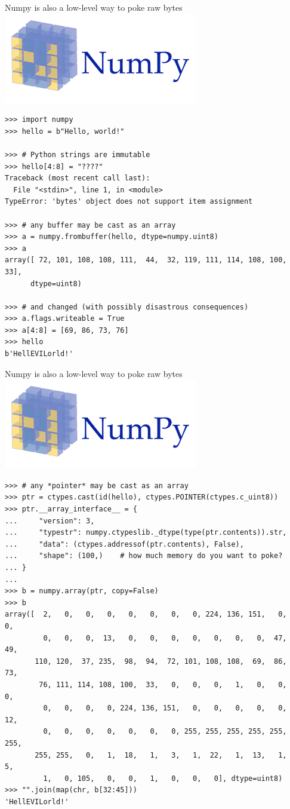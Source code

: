 \documentclass[aspectratio=169]{beamer}
\begin{document}
\begin{frame}[fragile]{Numpy is also a low-level way to poke raw bytes}
\vspace{0.5 cm}
\hfill \includegraphics[height=1.5 cm]{numpy-logo.png}

\scriptsize
\vspace{-1.5 cm}
\begin{verbatim}
>>> import numpy
>>> hello = b"Hello, world!"

>>> # Python strings are immutable
>>> hello[4:8] = "????"
Traceback (most recent call last):
  File "<stdin>", line 1, in <module>
TypeError: 'bytes' object does not support item assignment

>>> # any buffer may be cast as an array
>>> a = numpy.frombuffer(hello, dtype=numpy.uint8)
>>> a
array([ 72, 101, 108, 108, 111,  44,  32, 119, 111, 114, 108, 100,  33],
      dtype=uint8)

>>> # and changed (with possibly disastrous consequences)
>>> a.flags.writeable = True
>>> a[4:8] = [69, 86, 73, 76]
>>> hello
b'HellEVILorld!'
\end{verbatim}
\end{frame}

\begin{frame}[fragile]{Numpy is also a low-level way to poke raw bytes}
\vspace{0.5 cm}
\hfill \includegraphics[height=1.5 cm]{numpy-logo.png}

\scriptsize
\vspace{-1.5 cm}
\begin{verbatim}
>>> # any *pointer* may be cast as an array
>>> ptr = ctypes.cast(id(hello), ctypes.POINTER(ctypes.c_uint8))
>>> ptr.__array_interface__ = {
...     "version": 3,
...     "typestr": numpy.ctypeslib._dtype(type(ptr.contents)).str,
...     "data": (ctypes.addressof(ptr.contents), False),
...     "shape": (100,)    # how much memory do you want to poke?
... }
... 
>>> b = numpy.array(ptr, copy=False)
>>> b
array([  2,   0,   0,   0,   0,   0,   0,   0, 224, 136, 151,   0,   0,
         0,   0,   0,  13,   0,   0,   0,   0,   0,   0,   0,  47,  49,
       110, 120,  37, 235,  98,  94,  72, 101, 108, 108,  69,  86,  73,
        76, 111, 114, 108, 100,  33,   0,   0,   0,   1,   0,   0,   0,
         0,   0,   0,   0, 224, 136, 151,   0,   0,   0,   0,   0,  12,
         0,   0,   0,   0,   0,   0,   0, 255, 255, 255, 255, 255, 255,
       255, 255,   0,   1,  18,   1,   3,   1,  22,   1,  13,   1,   5,
         1,   0, 105,   0,   0,   1,   0,   0,   0], dtype=uint8)
>>> "".join(map(chr, b[32:45]))
'HellEVILorld!'
\end{verbatim}
\end{frame}
\end{document}
